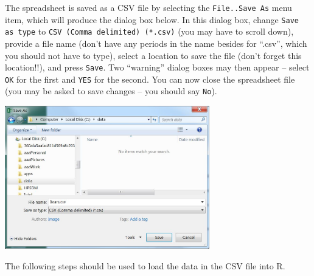 \documentclass[10pt,openany]{book}\usepackage[]{graphicx}\usepackage[]{color}
\begin{document}
The spreadsheet is saved as a CSV file by selecting the \verb"File..Save As" menu item, which will produce the dialog box below. In this dialog box, change \verb"Save as type" to \verb"CSV (Comma delimited) (*.csv)" (you may have to scroll down), provide a file name (don't have any periods in the name besides for ``.csv'', which you should not have to type), select a location to save the file (don't forget this location!!), and press \verb"Save".  Two ``warning'' dialog boxes may then appear -- select \verb"OK" for the first and \verb"YES" for the second.  You can now close the spreadsheet file (you may be asked to save changes -- you should say \verb"No").
\begin{center}
  \includegraphics[width=3.5in]{Figs/Data_File_2.jpg}
\end{center}

The following steps should be used to load the data in the CSV file into R.
\end{document}
